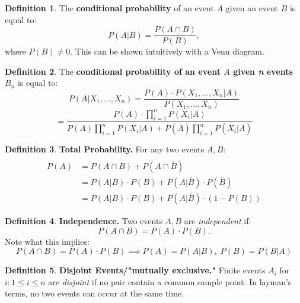 \documentclass[a4paper]{article}
\theoremstyle{definition}
\newtheorem{defn}{Definition}[section]
\begin{document}
\begin{defn} %
The \textbf{conditional probability} of an event $A$ given an event $B$ is equal to:
\begin{equation}
P(A|B) = \frac{P(A \cap B)}{P(B)},
\end{equation}
where $P(B) \neq 0$. This can be shown intuitively with a Venn diagram.
\end{defn}
\begin{defn} %
The \textbf{conditional probability of an event $A$ given \textit{n} events $B_n$} is equal to:
\begin{equation}
P(A|X_1,...,X_n) = \frac{P(A)\cdot P(X_1,...,X_n|A)}{P(X_1,...,X_n)}
\end{equation}
\begin{equation}
= \frac{P(A)\cdot \prod\limits_{i=1}^n P(X_i|A)}{P(A) \prod\limits_{i=1}^n P(X_i|A)+P(\overline A)\prod\limits_{i=1}^n P(X_i|\overline A)}
\end{equation}
\end{defn}
\bigbreak
\begin{defn} %
\textbf{Total Probability.} For any two events $A, B$:
\begin{align*} 
\\P(A) &= P(A \cap B)+P(A\cap\overline{B})
\\{} &= P(A|B)\cdot P(B) + P(A|\overline{B})\cdot P(\overline{B})
\\{} &= P(A|B)\cdot P(B) + P(A|\overline{B})\cdot (1-P(B))
\end{align*} 
\end{defn}
\bigbreak
\begin{defn} %
\textbf{Independence.} Two events $A, B$ are \textit{independent} if: 
$$P(A\cap B) = P(A) \cdot P(B).$$
Note what this implies: 
$$P(A\cap B) = P(A) \cdot P(B) \implies P(A) = P(A|B), \; P(B) = P(B|A)$$
\end{defn}
\bigbreak
\begin{defn} %
\textbf{Disjoint Events/"mutually exclusive."} Finite events $A_i$ for $i: 1 \leq i \leq n$ are \textit{disjoint} if no pair contain a common sample point. In layman's terms, no two events can occur at the same time.
\end{defn}
\end{document}
